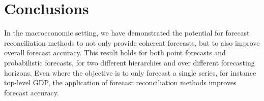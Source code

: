 \documentclass[graybox]{svmult}
\begin{document}
%
%
%
%
%
%
%
%
%
%
%
%




\pagebreak

\section{Conclusions}

In the macroeconomic setting, we have demonstrated the potential for forecast reconciliation methods to not only provide coherent forecasts, but to also improve overall forecast accuracy.  This result holds for both point forecasts and probabilistic forecasts, for two different hierarchies and over different forecasting horizons.  Even where the objective is to only forecast a single series, for instance top-level GDP, the application of forecast reconciliation methods improves forecast accuracy.
\end{document}
